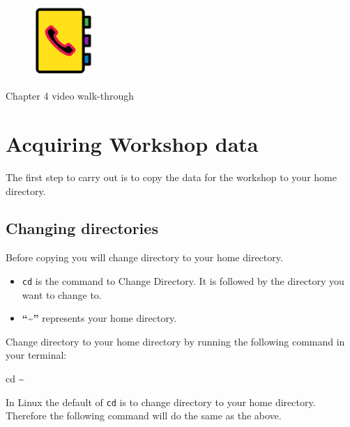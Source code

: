 \documentclass[
  letterpaper,
  DIV=11,
  numbers=noendperiod]{scrreprt}
\newenvironment{Shaded}{\begin{snugshade}}{\end{snugshade}}
\newcommand{\BuiltInTok}[1]{\textcolor[rgb]{0.00,0.23,0.31}{#1}}
\newcommand{\NormalTok}[1]{\textcolor[rgb]{0.00,0.23,0.31}{#1}}
\providecommand{\tightlist}{%
  \setlength{\itemsep}{0pt}\setlength{\parskip}{0pt}}\usepackage{longtable,booktabs,array}
\begin{document}
\begin{figure}

{\centering \includegraphics[width=0.2\textwidth,height=\textheight]{figures/directory.png}

}

\end{figure}

Chapter 4 video walk-through

\hypertarget{acquiring-workshop-data}{%
\section{Acquiring Workshop data}\label{acquiring-workshop-data}}

The first step to carry out is to copy the data for the workshop to your
home directory.

\hypertarget{changing-directories}{%
\subsection{Changing directories}\label{changing-directories}}

Before copying you will change directory to your home directory.

\begin{itemize}
\tightlist
\item
  \texttt{cd} is the command to Change Directory. It is followed by the
  directory you want to change to.
\item
  \textbf{``\textasciitilde{}''} represents your home directory.
\end{itemize}

Change directory to your home directory by running the following command
in your terminal:

\begin{Shaded}
\begin{Highlighting}[]
\BuiltInTok{cd}\NormalTok{ \textasciitilde{} }
\end{Highlighting}
\end{Shaded}

In Linux the default of \texttt{cd} is to change directory to your home
directory. Therefore the following command will do the same as the
above.
\end{document}
